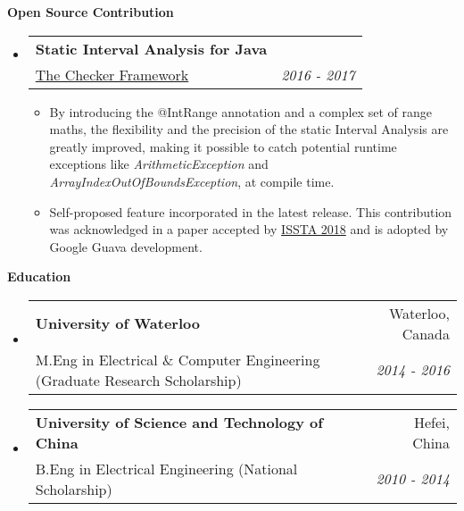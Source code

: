 \documentclass[letterpaper,10pt]{article}
\makeatletter
\newcommand{\resitem}[1]{\item #1 \vspace{-2pt}}
\newcommand{\resheading}[1]{{\large \colorbox{mygrey}{\begin{minipage}{\textwidth}{\textbf{#1 \vphantom{p\^{E}}}}\end{minipage}}}}
\newcommand{\ressubheading}[4]{
\begin{tabular*}{7.0in}{l@{\extracolsep{\fill}}r}
    \textbf{#1} & #2 \\
    #3 & \textit{#4} \\
\end{tabular*}\vspace{-6pt}}
\makeatother
\begin{document}
\resheading{Open Source Contribution}
\begin{itemize}
\itemsep0em
\item
	\ressubheading{Static Interval Analysis for Java}{}{\href{https://github.com/typetools/checker-framework}{The Checker Framework}}{2016 - 2017}
	\begin{itemize}
        \resitem{By introducing the @IntRange annotation and a complex set of range maths, the flexibility and the precision of the static Interval Analysis are greatly improved, making it possible to catch potential runtime exceptions like \textit{ArithmeticException} and \textit{ArrayIndexOutOfBoundsException}, at compile time.}
        \resitem{Self-proposed feature incorporated in the latest release. This contribution was acknowledged in a paper accepted by \href{https://homes.cs.washington.edu/~mernst/pubs/array-indexing-issta2018.pdf}{ISSTA 2018} and is adopted by Google Guava development. }
	\end{itemize}
	
\end{itemize}

\resheading{Education}
\begin{itemize}
\itemsep0em
\item
	\ressubheading{University of Waterloo}{Waterloo, Canada}{M.Eng in Electrical \& Computer Engineering (Graduate Research Scholarship)}{2014 - 2016}
\item
	\ressubheading{University of Science and Technology of China}{Hefei, China}{B.Eng in Electrical Engineering (National Scholarship)}{2010 - 2014}

\end{itemize}
\end{document}

